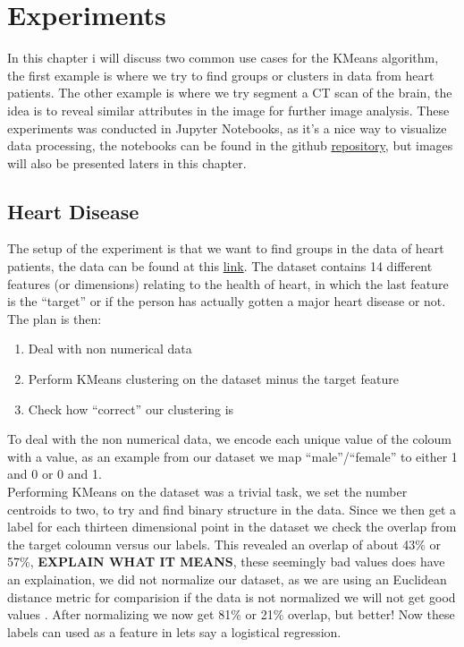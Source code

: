 \documentclass[12pt]{report}
\begin{document}
\chapter{Experiments}
\label{sec:experi}
In this chapter i will discuss two common use cases for the KMeans algorithm, the first example is where we try to find groups or clusters in data from heart patients. The other example is where we try segment a CT scan of the brain, the idea is to reveal similar attributes in the image for further image analysis. These experiments was conducted in Jupyter Notebooks, as it's a nice way to visualize data processing, the notebooks can be found in the github \href{https://github.com/shadesfear/bachelor}{repository}, but images will also be presented laters in this chapter.
\section{Heart Disease}
\label{sec:heart}
The setup of the experiment is that we want to find groups in the data of heart patients, the data can be found at this \href{https://www.kaggle.com/ronitf/heart-disease-uci}{link}. The dataset contains 14 different features (or dimensions) relating to the health of heart, in which the last feature is the ``target'' or if the person has actually gotten a major heart disease or not. The plan is then:
\begin{enumerate}
\item Deal with non numerical data
\item Perform KMeans clustering on the dataset minus the target feature
\item Check how ``correct'' our clustering is
\end{enumerate}
To deal with the non numerical data, we encode each unique value of the coloum with a value, as an example from our dataset we map ``male''/``female'' to either 1 and 0 or 0 and 1.\\
Performing KMeans on the dataset was a trivial task, we set the number centroids to two, to try and find binary structure in the data. Since we then get a label for each thirteen dimensional point in the dataset we check the overlap from the target coloumn versus our labels. This revealed an overlap of about 43\% or 57\%, \textbf{EXPLAIN WHAT IT MEANS}, these seemingly bad values does have an explaination, we did not normalize our dataset, as we are using an Euclidean distance metric for comparision if the data is not normalized we will not get good values \cite{kmeansconvergence}. After normalizing we now get 81\% or 21\% overlap, but better! Now these labels can used as a feature in lets say a logistical regression.
\end{document}
